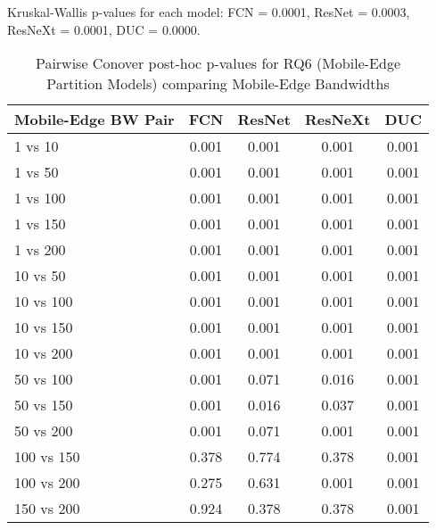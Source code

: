 \begin{table}[h]
\centering
\caption{Pairwise Conover post-hoc p-values for RQ6 (Mobile-Edge Partition Models) comparing Mobile-Edge Bandwidths}
\label{tab:conover_mobile_edge_partition}
\smallskip
Kruskal-Wallis p-values for each model: FCN = 0.0001, ResNet = 0.0003, ResNeXt = 0.0001, DUC = 0.0000.

\begin{tabular}{lcccc}
\toprule
Mobile-Edge BW Pair & FCN & ResNet & ResNeXt & DUC \\
\midrule
1 vs 10 & 0.001 & 0.001 & 0.001 & 0.001 \\
1 vs 50 & 0.001 & 0.001 & 0.001 & 0.001 \\
1 vs 100 & 0.001 & 0.001 & 0.001 & 0.001 \\
1 vs 150 & 0.001 & 0.001 & 0.001 & 0.001 \\
1 vs 200 & 0.001 & 0.001 & 0.001 & 0.001 \\
10 vs 50 & 0.001 & 0.001 & 0.001 & 0.001 \\
10 vs 100 & 0.001 & 0.001 & 0.001 & 0.001 \\
10 vs 150 & 0.001 & 0.001 & 0.001 & 0.001 \\
10 vs 200 & 0.001 & 0.001 & 0.001 & 0.001 \\
50 vs 100 & 0.001 & 0.071 & 0.016 & 0.001 \\
50 vs 150 & 0.001 & 0.016 & 0.037 & 0.001 \\
50 vs 200 & 0.001 & 0.071 & 0.001 & 0.001 \\
100 vs 150 & 0.378 & 0.774 & 0.378 & 0.001 \\
100 vs 200 & 0.275 & 0.631 & 0.001 & 0.001 \\
150 vs 200 & 0.924 & 0.378 & 0.378 & 0.001 \\
\bottomrule
\end{tabular}
\end{table}
